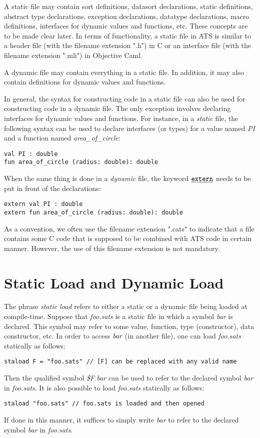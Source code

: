 A static file may contain sort definitions, datasort declarations, static
definitions, abstract type declarations, exception declarations, datatype
declarations, macro definitions, interfaces for dynamic values and
functions, etc.  These concepts are to be made clear later.  In terms of
functionality, a static file in ATS is similar to a header file (with the
filename extension ".h") in C or an interface file (with the filename
extension ".mli") in Objective Caml.

A dynamic file may contain everything in a static file. In addition, it may
also contain definitions for dynamic values and functions.

In general, the syntax for constructing code in a static file can also be
used for constructing code in a dynamic file. The only exception involves
declaring interfaces for dynamic values and functions. For instance, in a
{\it static} file, the following syntax can be used to declare interfaces
(or types) for a value named {\it PI} and a function named
{\it area\_of\_circle}:
\begin{verbatim}
val PI : double
fun area_of_circle (radius: double): double
\end{verbatim}
When the same thing is done in a {\it dynamic} file, the keyword
$\underline{\texttt{extern}}$ needs to be put in front of the declarations:
\begin{verbatim}
extern val PI : double
extern fun area_of_circle (radius: double): double
\end{verbatim}

As a convention, we often use the filename extension ".cats" to indicate
that a file contains some C code that is supposed to be combined with ATS
code in certain manner. However, the use of this filename extension is not
mandatory.


\section{Static Load and Dynamic Load}
The phrase {\em static load} refers to either a static or a dynamic file
being loaded at compile-time. Suppose that {\it foo.sats} is a static file
in which a symbol {\it bar} is declared. This symbol may refer to some
value, function, type (constructor), data constructor, etc.  In order to
access $\mbox{\it bar}$ (in another file), one can load {\it foo.sats}
statically as follows:
\begin{verbatim}
staload F = "foo.sats" // [F] can be replaced with any valid name
\end{verbatim}
Then the qualified symbol {\it \$F.bar} can be used to refer to the
declared symbol {\it bar} in {\it foo.sats}. It is also possible
to load {\it foo.sats} statically as follows:
\begin{verbatim}
staload "foo.sats" // foo.sats is loaded and then opened
\end{verbatim}
If done in this manner, it suffices to simply write {\it bar} to refer to
the declared symbol {\it bar} in {\it foo.sats}.

